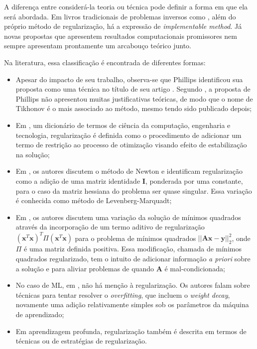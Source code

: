 A diferença entre considerá-la teoria ou técnica pode definir a forma em que ela será abordada.  Em livros tradicionais de problemas inversos como \cite[pág. 63]{engl1996regularization}, além do próprio método de regularização, há a expressão de \textit{implementable method}. Já novas propostas que apresentem resultados computacionais promissores nem sempre apresentam prontamente um arcabouço teórico junto. 

 Na literatura, essa classificação é encontrada de diferentes formas:
\begin{itemize}
\item Apesar do impacto de seu trabalho, observa-se que Phillips identificou sua proposta como uma técnica no título de seu artigo \cite{Phillips1962}. Segundo \cite{Morozov1984}, a proposta de Phillips não apresentou muitas justificativas teóricas, de modo que o nome de Tikhonov é o mais associado ao método, mesmo tendo sido publicado depois;

\item Em \cite{Laplante2000}, um dicionário de termos de ciência da computação, engenharia e tecnologia, regularização é definida como o procedimento de adicionar um termo de restrição ao processo de otimização visando efeito de estabilização na solução;
\item  Em \cite[pág. 193]{Sayed2003}, os autores discutem o método de Newton e identificam regularização como a adição de uma matriz identidade $\mathbf{I}$, ponderada por uma constante, para o caso da matriz hessiana do problema ser quase singular. Essa variação é conhecida como método de Levenberg-Marquadt;
\item  Em \cite[pág. 669]{Sayed2003}, os autores discutem uma variação da solução de mínimos quadrados através da incorporação de um termo aditivo de regularização $(\mathbf{x}^T \mathbf{x})^T \Pi (\mathbf{x}^T\mathbf{x})$  para o problema de mínimos quadrados $\vert \vert  \mathbf{A} \mathbf{x} - \mathbf{y}\vert \vert_2^2$, onde $\Pi$ é uma matriz definida positiva. Essa modificação, chamada de mínimos quadrados regularizado,  tem o intuito de adicionar informação \textit{a priori} sobre a solução e para aliviar problemas de quando  $\mathbf{A}$ é mal-condicionada; 
\item No caso de ML, em \cite{mitchell1997machine}, não há menção à regularização. Os autores falam sobre técnicas para tentar resolver o \textit{overfitting}, que incluem o \textit{weight decay}, novamente uma adição relativamente simples sob os parâmetros da máquina de aprendizado;
\item Em aprendizagem profunda, regularização também é descrita em termos de técnicas \cite{2017kukacka} ou de estratégias \cite{goodfellow2016deep} de regularização.
\end{itemize}

